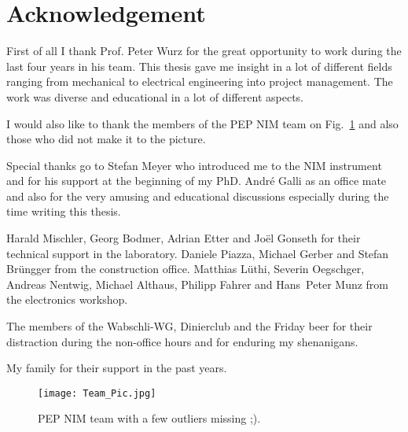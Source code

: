 \documentclass[a4paper, 12pt, abstracton]{scrartcl}
\begin{document}

	
	\newpage
	\thispagestyle{empty}
	\null
	\newpage
	
	\clearpage
	\newpage
	\thispagestyle{empty}
	\null
	\newpage
	
	\clearpage
	\newpage
	\thispagestyle{empty}
	\null
	\newpage
	
	\clearpage
	
	\clearpage
	
	\clearpage
	\newpage
	\thispagestyle{empty}
	\null
	\newpage
	
	\newpage
	\thispagestyle{empty}
	\null
	\newpage
	
	\section*{Acknowledgement}
	
	First of all I thank Prof. Peter Wurz for the great opportunity to work during the last four years in his team. This thesis gave me insight in a lot of different fields ranging from mechanical to electrical engineering into project management. The work was diverse and educational in a lot of different aspects.
	
	I would also like to thank the members of the PEP NIM team on Fig.~\ref{fig:TeamPic} and also those who did not make it to the picture.
	
	Special thanks go to Stefan Meyer who introduced me to the NIM instrument and for his support at the beginning of my PhD. André Galli as an office mate and also for the very amusing and educational discussions especially during the time writing this thesis.
	
	Harald Mischler, Georg Bodmer, Adrian Etter and Joël Gonseth for their technical support in the laboratory. Daniele Piazza, Michael Gerber and Stefan Brüngger from the construction office. Matthias Lüthi, Severin Oegschger, Andreas Nentwig, Michael Althaus, Philipp Fahrer and Hans~Peter Munz from the electronics workshop.
	
	The members of the Wabschli-WG, Dinierclub and the Friday beer for their distraction during the non-office hours and for enduring my shenanigans.
	
	My family for their support in the past years.
	
	\begin{figure}[h]
		\centering
		\texttt{[image: Team\_Pic.jpg]}
		\caption{PEP NIM team with a few outliers missing ;).}
		\label{fig:TeamPic}
	\end{figure}
	
	\newpage
	\thispagestyle{empty}
	\null
	\newpage
	
	
	\newpage
	\thispagestyle{empty}
	\null
	\newpage
	
	
	\newpage
	\thispagestyle{empty}
	\null
	\newpage
	
	
\end{document}
